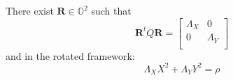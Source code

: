 \documentclass[aps,12pt]{revtex4}
\begin{document}
 There exist $\bm{R}\in\mathbb{O}^2$ such that
\begin{equation}
\bm{R}^tQ\bm{R} = \begin{bmatrix}
\Lambda_X & 0 \\
0         & \Lambda_Y\\
\end{bmatrix}
\end{equation}
and in the rotated framework:
\begin{equation}
\Lambda_X X^2 + \Lambda_Y Y^2 = \rho
\end{equation}
\end{document}
